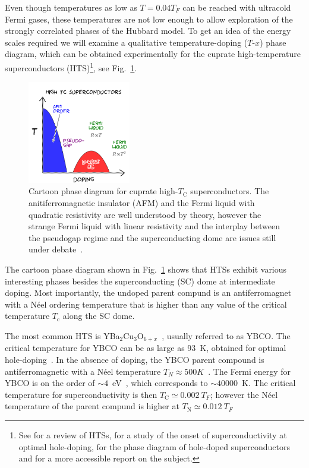 \documentclass[oneside,11pt]{memoir}
\begin{document}
Even though temperatures as low as $T=0.04T_{F}$ can be reached with ultracold
Fermi gases, these temperatures are not low enough to allow exploration of the
strongly correlated phases of the Hubbard model.  To get an idea of the energy
scales required we will examine a qualitative temperature-doping ($T$-$x$)
phase diagram, which can be obtained experimentally for the cuprate
high-temperature superconductors (HTS)\footnote{See \cite{Damascelli2003} for a
review of HTSs, \cite{He2011} for a study of the onset of superconductivity at
optimal hole-doping, \cite{Jin2011} for the phase diagram of hole-doped
superconductors and \cite{Grant2011} for a more accessible report on the
subject.}, see Fig.~\ref{fig:cartoon-phasediag}.
\begin{figure} \centering
\includegraphics[width=0.4\textwidth]{../figures/hubbard/highTc.png}
\caption[Cartoon phase diagram for cuprate high-$T_{\text{C}}$
superconductors.]{\small Cartoon phase diagram for cuprate high-$T_{\text{C}}$
superconductors. The anitiferromagnetic insulator (AFM) and the Fermi liquid
with quadratic resistivity are well understood by theory, however the strange
Fermi liquid with linear resistivity and the interplay between the pseudogap
regime and the superconducting dome are issues still under
debate~\cite{Grant2011}. }
\label{fig:cartoon-phasediag}
\end{figure}

The cartoon phase diagram shown in Fig.~\ref{fig:cartoon-phasediag} shows that
HTSs exhibit various interesting phases besides the superconducting (SC) dome
at intermediate doping.   Most importantly, the undoped parent compund is an
antiferromagnet with a N\'{e}el ordering temperature that is higher than 
any value of the critical temperature $T_{\text{c}}$ along the SC dome.  

The most common HTS is YBa$_{2}$Cu$_{3}$O$_{6+x}$~\cite{Milton2010}, usually
referred to as YBCO.  The critical temperature for YBCO can be as large as
93~K, obtained for optimal hole-doping~\cite{Wu1987}. In the absence of doping,
the YBCO parent compound is antiferromagnetic with a N\'{e}el temperature
$T_{N} \approx 500 K$~\cite{Tranquada1988}.  The Fermi energy for YBCO is on
the order of $\sim 4$~eV~\cite{liang2008ybco}, which corresponds to $\sim
40000$~K.  The critical temperature for superconductivity is then $T_{\text{C}}
\simeq 0.002~T_{F}$;  however the N\'{e}el temperature of the parent compund is
higher at $T_{\text{N}} \simeq 0.012~T_{F}$ 
\end{document}
